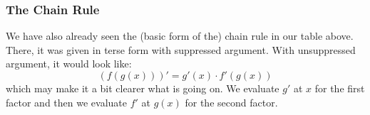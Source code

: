 \subsubsection{The Chain Rule}
We have also already seen the (basic form of the) chain rule in our table above. There, it was given in terse form with suppressed argument. With unsuppressed argument, it would look like:
\begin{equation}
 (f( g(x)))' = g'(x) \cdot f'(g(x))
\end{equation}
which may make it a bit clearer what is going on. We evaluate $g'$ at $x$ for the first factor and then we evaluate $f'$ at $g(x)$ for the second factor.

